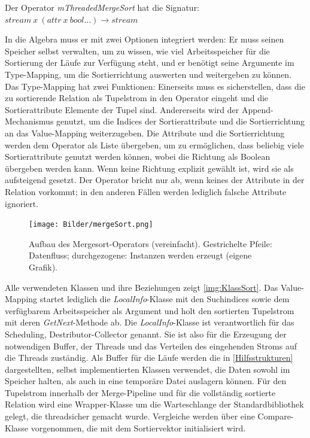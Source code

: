 \documentclass[a4paper,12pt,twoside]{article}
\newcommand{\Fb}[1]{\textit{#1}} %
\begin{document}
Der Operator \Fb{mThreadedMergeSort} hat die Signatur: \newline
$stream~x~(attr~x~bool \ldots) \longrightarrow stream$
 
In die Algebra muss er mit zwei Optionen integriert werden: Er muss seinen Speicher selbst verwalten, um zu wissen, wie viel Arbeitsspeicher für die Sortierung der Läufe zur Verfügung steht, und er benötigt seine Argumente im Type-Mapping, um die Sortierrichtung auswerten und weitergeben zu können. Das Type-Mapping hat zwei Funktionen: Einerseits muss es sicherstellen, dass die zu sortierende Relation als Tupelstrom in den Operator eingeht und die Sortierattribute Elemente der Tupel sind. Andererseits wird der Append-Mechanismus genutzt, um die Indices der Sortierattribute und die Sortierrichtung an das Value-Mapping weiterzugeben. Die Attribute und die Sortierrichtung werden dem Operator als Liste übergeben, um zu ermöglichen, dass beliebig viele Sortierattribute genutzt werden können, wobei die Richtung als Boolean übergeben werden kann. Wenn keine Richtung explizit gewählt ist, wird sie als aufsteigend gesetzt. Der Operator bricht nur ab, wenn keines der Attribute in der Relation vorkommt; in den anderen Fällen werden lediglich falsche Attribute ignoriert. 

\begin{figure}
	\centering
	\texttt{[image: Bilder/mergeSort.png]}
	\caption{Aufbau des Mergesort-Operators (vereinfacht). Gestrichelte Pfeile: Datenfluss; durchgezogene: Instanzen werden erzeugt (eigene Grafik).}
	\label{img:KlassSort}
\end{figure}

Alle verwendeten Klassen und ihre Beziehungen zeigt \autoref{img:KlassSort}. Das Value-Mapping startet lediglich die \Fb{LocalInfo}-Klasse mit den Suchindices sowie dem verfügbarem Arbeitsspeicher als Argument und holt den sortierten Tupelstrom mit deren \Fb{GetNext}-Methode ab. Die \Fb{LocalInfo}-Klasse ist verantwortlich für das Scheduling, Destributor-Collector genannt. Sie ist also für die Erzeugung der notwendigen Buffer, der Threads und das Verteilen des eingehenden Stroms auf die Threads zuständig. Als Buffer für die Läufe werden die in \autoref{Hilfsstrukturen} dargestellten, selbst implementierten Klassen verwendet, die Daten sowohl im Speicher halten, als auch in eine temporäre Datei auslagern können. Für den Tupelstrom innerhalb der Merge-Pipeline und für die vollständig sortierte Relation wird eine Wrapper-Klasse um die Warteschlange der Standardbibliothek gelegt, die threadsicher gemacht wurde. Vergleiche werden über eine Compare-Klasse vorgenommen, die mit dem Sortiervektor initialisiert wird.
\end{document}
